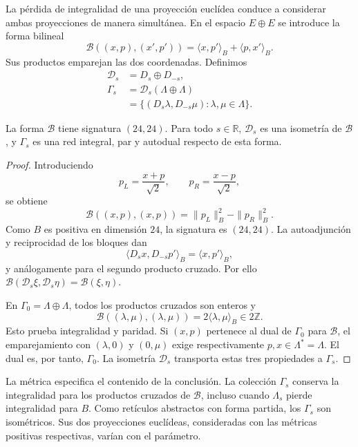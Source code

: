 La pérdida de integralidad de una proyección euclídea conduce a
considerar ambas proyecciones de manera simultánea. En el espacio
\(E\oplus E\) se introduce la forma bilineal
\begin{equation}
 \mathcal B((x,p),(x',p'))=
       \langle x,p'\rangle_B+\langle p,x'\rangle_B.
 \label{eq:leech-split-form}
\end{equation}
Sus productos emparejan las dos coordenadas. Definimos
\begin{equation}
\begin{split}
 \mathcal D_s&=D_s\oplus D_{-s},\\
 \Gamma_s&=\mathcal D_s(\Lambda\oplus\Lambda)\\
 &=\{(D_s\lambda,D_{-s}\mu):\lambda,\mu\in\Lambda\}.
\end{split}
\label{eq:leech-split-lattice}
\end{equation}

\begin{theorem}
\label{thm:leech-split}
La forma \(\mathcal B\) tiene signatura \((24,24)\).
Para todo \(s\in\mathbb R\), \(\mathcal D_s\) es una isometría de
\(\mathcal B\), y \(\Gamma_s\) es una red integral, par y autodual
respecto de esta forma.
\end{theorem}
\begin{proof}
Introduciendo
\[
 p_L=\frac{x+p}{\sqrt2},\qquad
 p_R=\frac{x-p}{\sqrt2},
\]
se obtiene
\[
 \mathcal B((x,p),(x,p))=\|p_L\|_B^2-\|p_R\|_B^2.
\]
Como \(B\) es positiva en dimensión \(24\), la signatura es
\((24,24)\). La autoadjunción y reciprocidad de los bloques dan
\[
 \langle D_sx,D_{-s}p'\rangle_B=\langle x,p'\rangle_B,
\]
y análogamente para el segundo producto cruzado. Por ello
\(\mathcal B(\mathcal D_s\xi,\mathcal D_s\eta)=\mathcal B(\xi,\eta)\).

En \(\Gamma_0=\Lambda\oplus\Lambda\), todos los productos cruzados
son enteros y
\[
 \mathcal B((\lambda,\mu),(\lambda,\mu))
   =2\langle\lambda,\mu\rangle_B\in2\mathbb Z.
\]
Esto prueba integralidad y paridad. Si \((x,p)\) pertenece al dual
de \(\Gamma_0\) para \(\mathcal B\), el emparejamiento con
\((\lambda,0)\) y \((0,\mu)\) exige respectivamente
\(p,x\in\Lambda^*=\Lambda\). El dual es, por tanto, \(\Gamma_0\).
La isometría \(\mathcal D_s\) transporta estas tres propiedades
a \(\Gamma_s\).
\end{proof}

La métrica especifica el contenido de la conclusión. La colección
\(\Gamma_s\) conserva la integralidad para los productos cruzados
de \(\mathcal B\), incluso cuando \(\Lambda_s\) pierde integralidad
para \(B\). Como retículos abstractos con forma partida, los
\(\Gamma_s\) son isométricos. Sus dos proyecciones euclídeas,
consideradas con las métricas positivas respectivas, varían con
el parámetro.

